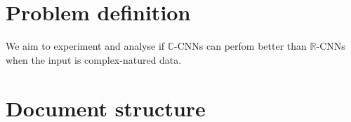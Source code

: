 %


\section{Problem definition} \label{sect:thefirst}
We aim to experiment and analyse if $\mathbb{C}$-CNNs can perfom better than $\mathbb{R}$-CNNs when the input is complex-natured data.




\section{Document structure} \label{sect:thefirst}


